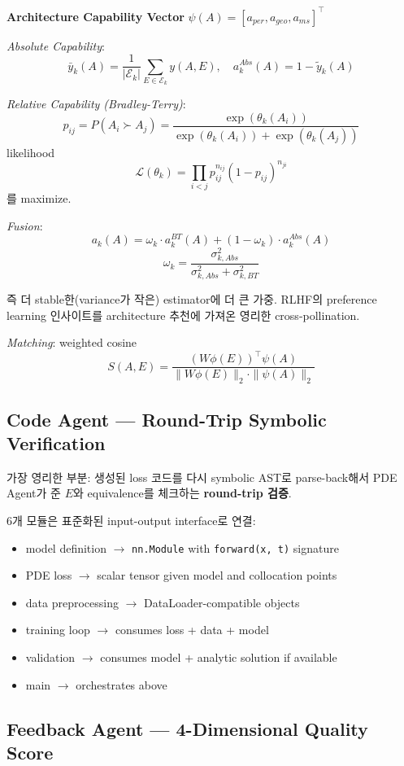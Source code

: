 \documentclass[11pt,a4paper,oneside]{report}
\newcommand{\code}[1]{\texttt{#1}}
\begin{document}
\textbf{Architecture Capability Vector} $\psi(A) = [a_{per}, a_{geo}, a_{ms}]^\top$

\textit{Absolute Capability}:
\[
\bar{y}_k(A) = \frac{1}{|\mathcal{E}_k|} \sum_{E \in \mathcal{E}_k} y(A, E), \quad a^{Abs}_k(A) = 1 - \tilde{y}_k(A)
\]

\textit{Relative Capability (Bradley-Terry)}:
\[
p_{ij} = P(A_i \succ A_j) = \frac{\exp(\theta_k(A_i))}{\exp(\theta_k(A_i)) + \exp(\theta_k(A_j))}
\]
likelihood
\[
\mathcal{L}(\theta_k) = \prod_{i<j} p_{ij}^{n_{ij}} (1 - p_{ij})^{n_{ji}}
\]
를 maximize.

\textit{Fusion}:
\[
a_k(A) = \omega_k \cdot a^{BT}_k(A) + (1 - \omega_k) \cdot a^{Abs}_k(A)
\]
\[
\omega_k = \frac{\sigma^2_{k,Abs}}{\sigma^2_{k,Abs} + \sigma^2_{k,BT}}
\]

즉 더 stable한(variance가 작은) estimator에 더 큰 가중. RLHF의 preference learning 인사이트를 architecture 추천에 가져온 영리한 cross-pollination.

\textit{Matching}: weighted cosine
\[
S(A, E) = \frac{(W\phi(E))^\top \psi(A)}{\|W\phi(E)\|_2 \cdot \|\psi(A)\|_2}
\]

\subsection{Code Agent --- Round-Trip Symbolic Verification}

가장 영리한 부분: 생성된 loss 코드를 다시 symbolic AST로 parse-back해서 PDE Agent가 준 $E$와 equivalence를 체크하는 \textbf{round-trip 검증}.

6개 모듈은 표준화된 input-output interface로 연결:
\begin{itemize}
\item model definition $\rightarrow$ \code{nn.Module} with \code{forward(x, t)} signature
\item PDE loss $\rightarrow$ scalar tensor given model and collocation points
\item data preprocessing $\rightarrow$ DataLoader-compatible objects
\item training loop $\rightarrow$ consumes loss + data + model
\item validation $\rightarrow$ consumes model + analytic solution if available
\item main $\rightarrow$ orchestrates above
\end{itemize}

\subsection{Feedback Agent --- 4-Dimensional Quality Score}
\end{document}

